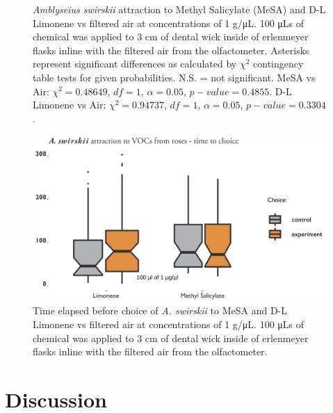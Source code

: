 \documentclass{ufdissertation}[overrideChapters] %
\begin{document}
{\begin{figure}
\caption[\textit{Amblyseius swirskii} attraction to Methyl Salicylate (MeSA) and D-L Limonene vs filtered air]{\textit{Amblyseius swirskii} attraction to Methyl Salicylate (MeSA) and D-L Limonene vs filtered air at concentrations of 1 g/\si{\micro\liter}. 100 \si{\micro\liter}s of chemical was applied to 3 cm of dental wick inside of erlenmeyer flasks inline with the filtered air from the olfactometer. Asterisks represent significant differences as calculated by $\chi^2$ contingency table tests for given probabilities. N.S. = not significant. MeSA vs Air: $\chi^2 = 0.48649$, $df = 1$, $\alpha = 0.05$, $p-value = 0.4855$. D-L Limonene vs Air: $\chi^2 = 0.94737$, $df = 1$, $\alpha = 0.05$, $p-value = 0.3304$.}\label{fig:aswir-mesa-lim}
\end{figure}
\begin{figure}

{\centering \includegraphics[width=1\linewidth]{figure/rrv_graph_olfact_vocs_time_choice} 

}

\caption[Time elapsed before choice of \textit{A. swirskii} to MeSA and D-L Limonene vs filtered air]{Time elapsed before choice of \textit{A. swirskii} to MeSA and D-L Limonene vs filtered air at concentrations of 1 g/\si{\micro\liter}. 100 \si{\micro\liter}s of chemical was applied to 3 cm of dental wick inside of erlenmeyer flasks inline with the filtered air from the olfactometer.}\label{fig:aswir-mesa-lim-times}
\end{figure}
\hypertarget{discussion-1}{%
\section{Discussion}\label{discussion-1}}

}
\end{document}
